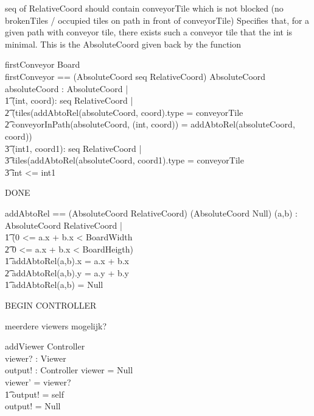 \documentclass[a4paper,11pt]{article}
\begin{document}
seq of RelativeCoord should contain conveyorTile which is not blocked (no brokenTiles / occupied tiles on path in front of conveyorTile)
Specifies that, for a given path with conveyor tile, there exists such a conveyor tile that the int is minimal. This is the AbsoluteCoord given back by the function
\begin{schema}{firstConveyor}
\Xi Board \\
firstConveyor == (AbsoluteCoord \cross seq RelativeCoord) \rightarrow AbsoluteCoord
\where
\exists absoluteCoord : AbsoluteCoord |  \\ \t1
\exists (int, coord): seq RelativeCoord |  \\ \t2
(tiles(addAbtoRel(absoluteCoord, coord).type = conveyorTile \\ \t2
conveyorInPath(absoluteCoord, (int, coord)) = addAbtoRel(absoluteCoord, coord)) \implies \\ \t3
\forall (int1, coord1): seq RelativeCoord | \\ \t3
\IF tiles(addAbtoRel(absoluteCoord, coord1).type = conveyorTile \\ \t3
\THEN int <= int1
\end{schema}

DONE
\begin{axdef}
addAbtoRel == (AbsoluteCoord \cross RelativeCoord) \rightarrow (AbsoluteCoord \union Null)
\where
\forall (a,b) : AbsoluteCoord \cross RelativeCoord | \\ \t1
\IF (0 <= a.x + b.x < BoardWidth \\ \t2
0 <= a.x + b.x < BoardHeigth) \\ \t1
\THEN
addAbtoRel(a,b).x = a.x + b.x \\ \t2
addAbtoRel(a,b).y = a.y + b.y \\ \t1
\ELSE addAbtoRel(a,b) = Null
\end{axdef}


BEGIN CONTROLLER

meerdere viewers mogelijk?
\begin{schema}{addViewer}
\Delta Controller \\
viewer? : Viewer \\
output! : Controller 
\where
\IF viewer = Null \\
\THEN viewer' = viewer? \\ \t1
output! = self \\
\ELSE output! = Null
\end{schema}
\end{document}
